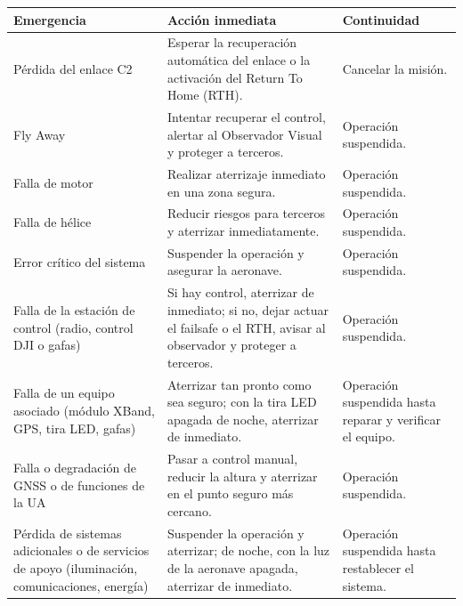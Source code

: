 \begin{longtable}{|p{4.5cm}|p{6cm}|p{3.5cm}|}
\hline

\textbf{Emergencia} &
\textbf{Acción inmediata} &
\textbf{Continuidad}

\\ \hline

Pérdida del enlace C2 &
Esperar la recuperación automática del enlace o la activación del Return To Home (RTH). &
Cancelar la misión.

\\ \hline

Fly Away &
Intentar recuperar el control, alertar al Observador Visual y proteger a terceros. &
Operación suspendida.

\\ \hline

Falla de motor &
Realizar aterrizaje inmediato en una zona segura. &
Operación suspendida.

\\ \hline

Falla de hélice &
Reducir riesgos para terceros y aterrizar inmediatamente. &
Operación suspendida.

\\ \hline

Error crítico del sistema &
Suspender la operación y asegurar la aeronave. &
Operación suspendida.

\\ \hline

Falla de la estación de control (radio, control DJI o gafas) &
Si hay control, aterrizar de inmediato; si no, dejar actuar el failsafe o el RTH, avisar al observador y proteger a terceros. &
Operación suspendida.

\\ \hline

Falla de un equipo asociado (módulo XBand, GPS, tira LED, gafas) &
Aterrizar tan pronto como sea seguro; con la tira LED apagada de noche, aterrizar de inmediato. &
Operación suspendida hasta reparar y verificar el equipo.

\\ \hline

Falla o degradación de GNSS o de funciones de la UA &
Pasar a control manual, reducir la altura y aterrizar en el punto seguro más cercano. &
Operación suspendida.

\\ \hline

Pérdida de sistemas adicionales o de servicios de apoyo (iluminación, comunicaciones, energía) &
Suspender la operación y aterrizar; de noche, con la luz de la aeronave apagada, aterrizar de inmediato. &
Operación suspendida hasta restablecer el sistema.


\end{longtable}
